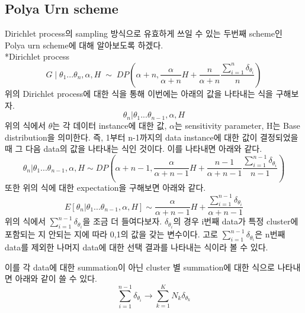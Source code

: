 \documentclass[a4paper]{oblivoir}
\begin{document}
\subsection{Polya Urn scheme}
Dirichlet process의 sampling 방식으로 유효하게 쓰일 수 있는 두번째 scheme인 Polya urn scheme에 대해 알아보도록 하겠다.  \\

*Dirichlet process
\begin{equation}
G\;|\;\theta_{1}...\theta_{n},\alpha,H \;\sim\; DP(\alpha+n , \frac{\alpha}{\alpha+n}H+\frac{n}{\alpha+n}\frac{\sum^{n}_{i=1}\delta_{\theta_{i}}}{n})
\end{equation}
위의 Dirichlet process에 대한 식을 통해 이번에는 아래의 값을 나타내는 식을 구해보자.
\begin{equation}
\theta_{n}|\theta_{1}...\theta_{n-1},\alpha,H
\end{equation}
위의 식에서 $\theta$는 각 데이터 instance에 대한 값, $\alpha$는 sensitivity parameter, H는 Base distribution을 의미한다. 즉, 1부터 n-1까지의 data instance에 대한 값이 결정되었을 때 그 다음 data의 값을 나타내는 식인 것이다. 이를 나타내면 아래와 같다.
\begin{equation}
\theta_{n}|\theta_{1}...\theta_{n-1},\alpha,H \sim DP(\alpha+n-1,\frac{\alpha}{\alpha+n-1}H + \frac{n-1}{\alpha+n-1}\frac{\sum^{n-1}_{i=1}\delta_{\theta_{i}}}{n-1})
\end{equation}
또한 위의 식에 대한 expectation을 구해보면 아래와 같다.
\begin{equation}
E[\theta_{n}|\theta_{1}...\theta_{n-1},\alpha,H] \sim \frac{\alpha}{\alpha+n-1}H+\frac{\sum^{n-1}_{i=1}\delta_{\theta_{i}}}{\alpha+n-1}
\end{equation}
위의 식에서 $\sum^{n-1}_{i=1}\delta_{\theta_{i}}$을 조금 더 들여다보자. $\delta_{\theta_{i}}$의 경우 i번째 data가 특정 cluster에 포함되는 지 안되는 지에 따라 0,1의 값을 갖는 변수이다. 고로 $\sum^{n-1}_{i=1}\delta_{\theta_{i}}$은 n번째 data를 제외한 나머지 data에 대한 선택 결과를 나타내는 식이라 볼 수 있다.

이를 각 data에 대한 summation이 아닌 cluster 별 summation에 대한 식으로 나타내면 아래와 같이 쓸 수 있다. 
\begin{equation}
\sum^{n-1}_{i=1}\delta_{\theta_{i}} \rightarrow \sum^{K}_{k=1}N_{k}\delta_{\theta_{k}}
\end{equation}
\end{document}
